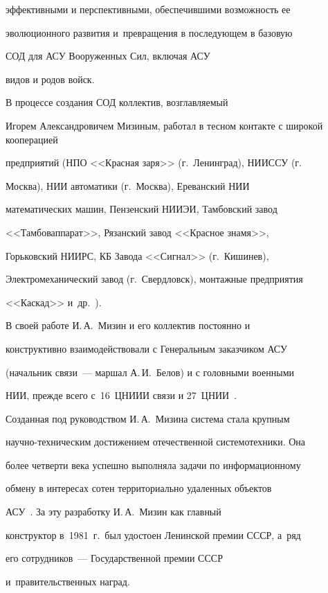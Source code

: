 эффективными и перспективными, обеспечившими возможность ее 

эволюционного развития и~превращения в последующем в базовую 

СОД для АСУ Вооруженных Сил, включая АСУ 

видов и родов войск.

   

   В процессе создания СОД коллектив, возглавляемый 

Игорем Александровичем Мизиным, работал в тесном контакте с широкой кооперацией 

предприятий (НПО <<Красная заря>> (г.~Ленинград), НИИССУ (г. 

Москва), НИИ автоматики (г.~Москва), Ереванский НИИ 

математических машин, Пензенский НИИЭИ, Тамбовский завод 

<<Тамбоваппарат>>, Рязанский завод <<Красное знамя>>, 

Горьковский НИИРС, КБ Завода <<Сигнал>> (г.~Кишинев), 

Электромеханический завод (г.~Свердловск), монтажные предприятия 

<<Каскад>>    и~др.~\cite{16-sok}). 

   

   В своей работе И.\,А.~Мизин и его коллектив постоянно и 

конструктивно взаимодействовали с Генеральным заказчиком АСУ 

(начальник связи~--- маршал А.\,И.~Белов) и с головными военными 

НИИ, прежде всего с~16~ЦНИИИ связи и 27~ЦНИИ~\cite{12-sok, 13-sok, 14-sok, 15-sok, 16-sok}.

   



  Созданная под руководством И.\,А.~Мизина система стала крупным 

на\-уч\-но-тех\-ни\-че\-ским достижением отечественной системотехники. Она 

более четверти века успешно выполняла задачи по информационному 

обмену в интересах сотен территориально удаленных объектов 

АСУ~\cite{16-sok}. За эту разработку И.\,А.~Мизин как главный 

конструктор в~1981~г.\ был удостоен Ленинской премии СССР, а~ряд 

его сотрудников~--- Государственной премии СССР 

и~правительственных наград. 



